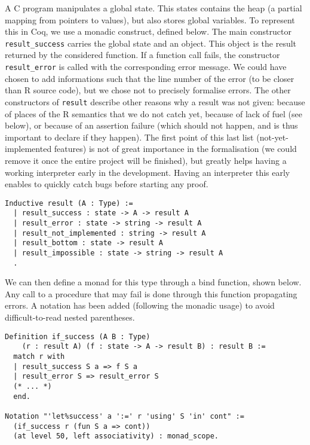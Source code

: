 \documentclass{article}
\newcommand\Coq{Coq}
\newcommand\R{R}
\newcommand\Cn{C}
\begin{document}
A \Cn{} program manipulates a global state.
This states contains the heap
(a partial mapping from pointers to values),
but also stores global variables.
To represent this in \Coq{}, we use a monadic construct, defined below.
The main constructor \texttt{result_success}
carries the global state and an object.
This object is the result returned by the considered function.
If a function call fails,
the constructor \texttt{result_error}
is called with the corresponding error message.
We could have chosen to add informations
such that the line number of the error
(to be closer than \R{} source code),
but we chose not to precisely formalise errors.
The other constructors of \texttt{result}
describe other reasons why a result was not given:
because of places of the \R{} semantics that we do not catch yet,
because of lack of fuel (see below),
or because of an assertion failure
(which should not happen,
and is thus important to declare if they happen).
The first point of this last list
(not-yet-implemented features) is not of great importance
in the formalisation
(we could remove it once the entire project will be finished),
but greatly helps having a working interpreter early
in the development.
Having an interpreter this early enables to quickly catch
bugs before starting any proof.
\begin{verbatim}
Inductive result (A : Type) :=
  | result_success : state -> A -> result A
  | result_error : state -> string -> result A
  | result_not_implemented : string -> result A
  | result_bottom : state -> result A
  | result_impossible : state -> string -> result A
  .
\end{verbatim}

We can then define a monad for this type
through a bind function, shown below.
Any call to a procedure that may fail
is done through this function
propagating errors.
A notation has been added
(following the monadic usage)
to avoid difficult-to-read nested parentheses.
\begin{verbatim}
Definition if_success (A B : Type)
    (r : result A) (f : state -> A -> result B) : result B :=
  match r with
  | result_success S a => f S a
  | result_error S => result_error S
  (* ... *)
  end.

Notation "'let%success' a ':=' r 'using' S 'in' cont" :=
  (if_success r (fun S a => cont))
  (at level 50, left associativity) : monad_scope.
\end{verbatim}
\end{document}
